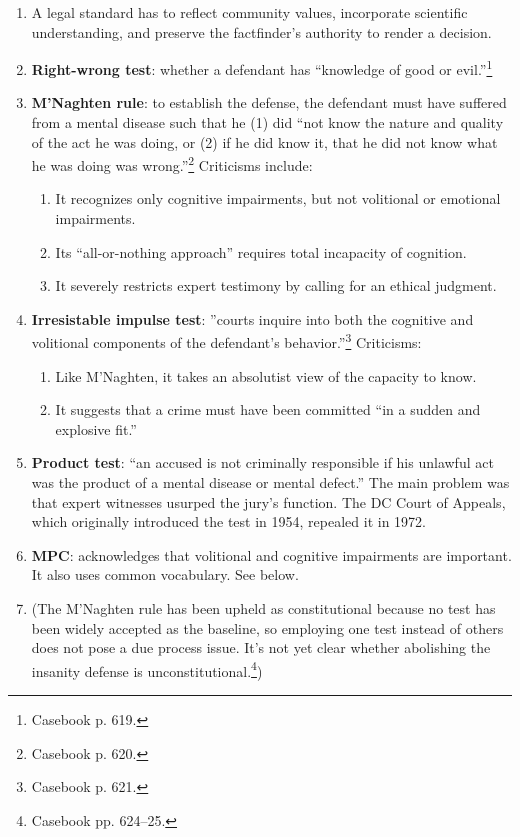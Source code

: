 \begin{enumerate}
    \item A legal standard has to reflect community values, incorporate 
    scientific understanding, and preserve the factfinder's authority to 
    render a decision.
    \item \textbf{Right-wrong test}: whether a defendant has ``knowledge of 
    good or evil.''\footnote{Casebook p. 619.}
    \item \textbf{M'Naghten rule}: to establish the defense, the defendant     
    must have suffered from a mental disease such that he (1) did ``not know 
    the nature and quality of the act he was doing, or (2) if he did know 
    it, that he did not know what he was doing was wrong.''\footnote{Casebook 
    p. 620.} Criticisms include:
    \begin{enumerate}
        \item It recognizes only cognitive impairments, but not volitional or 
        emotional impairments.
        \item Its ``all-or-nothing approach'' requires total incapacity of 
        cognition.
        \item It severely restricts expert testimony by calling for an ethical 
        judgment.
    \end{enumerate}
    \item \textbf{Irresistable impulse test}: ''courts inquire into both the 
    cognitive and volitional components of the defendant's 
    behavior.''\footnote{Casebook p. 621.} Criticisms:
    \begin{enumerate}
        \item Like M'Naghten, it takes an absolutist view of the capacity to 
        know.
        \item It suggests that a crime must have been committed ``in a sudden 
        and explosive fit.''
    \end{enumerate}
    \item \textbf{Product test}: ``an accused is not criminally responsible if 
    his unlawful act was the product of a mental disease or mental defect.'' 
    The main problem was that expert witnesses usurped the jury's function. 
    The DC Court of Appeals, which originally introduced the test in 1954, 
    repealed it in 1972.
    \item \textbf{MPC}: acknowledges that volitional and cognitive impairments 
    are important. It also uses common vocabulary. See below.
    \item (The M'Naghten rule has been upheld as constitutional because no 
    test has been widely accepted as the baseline, so employing one test 
    instead of others does not pose a due process issue. It's not yet clear 
    whether abolishing the insanity defense is 
    unconstitutional.\footnote{Casebook pp. 624--25.})
\end{enumerate}

